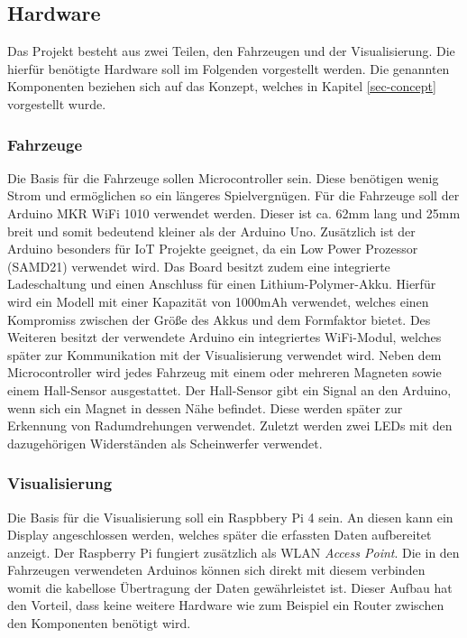 \documentclass[.../Dokumentation.tex]{subfiles}
\begin{document}
\subsection{Hardware}\label{sec-components-hardware}
Das Projekt besteht aus zwei Teilen, den Fahrzeugen und der Visualisierung.
Die hierfür benötigte Hardware soll im Folgenden vorgestellt werden.
Die genannten Komponenten beziehen sich auf das Konzept, welches in Kapitel 
\ref{sec-concept} vorgestellt wurde.
\subsubsection{Fahrzeuge}
Die Basis für die Fahrzeuge sollen Microcontroller sein. Diese benötigen 
wenig Strom und ermöglichen so ein längeres Spielvergnügen. 
Für die Fahrzeuge soll der Arduino MKR WiFi 1010 verwendet 
werden. Dieser ist 
ca. 62mm lang und 25mm breit und somit bedeutend kleiner als der Arduino Uno. 
Zusätzlich ist der Arduino besonders für IoT Projekte geeignet, da ein Low 
Power Prozessor (SAMD21) verwendet wird. Das Board besitzt zudem eine 
integrierte Ladeschaltung und einen Anschluss für einen Lithium-Polymer-Akku. 
Hierfür wird ein Modell mit einer Kapazität von 1000mAh verwendet, welches 
einen Kompromiss zwischen der Größe des Akkus und dem Formfaktor bietet. 
Des Weiteren besitzt der verwendete Arduino ein integriertes WiFi-Modul, welches 
später zur Kommunikation mit der Visualisierung verwendet wird.
Neben dem Microcontroller wird jedes Fahrzeug mit einem oder mehreren Magneten sowie einem 
Hall-Sensor ausgestattet. Der Hall-Sensor gibt ein Signal an den Arduino, 
wenn sich ein Magnet in dessen Nähe befindet. Diese werden später zur Erkennung 
von Radumdrehungen verwendet. Zuletzt werden zwei LEDs mit den dazugehörigen 
Widerständen als Scheinwerfer verwendet.

\subsubsection{Visualisierung}
Die Basis für die Visualisierung soll ein Raspbbery Pi 4 sein. An diesen kann 
ein Display angeschlossen werden, welches später die erfassten Daten 
aufbereitet anzeigt. Der Raspberry Pi fungiert zusätzlich als WLAN 
\textit{Access Point}. Die in den Fahrzeugen verwendeten Arduinos können sich 
direkt mit diesem verbinden womit die kabellose Übertragung der Daten 
gewährleistet ist. Dieser Aufbau hat den Vorteil, dass keine weitere 
Hardware wie zum Beispiel ein Router zwischen den Komponenten benötigt wird.
\end{document}
